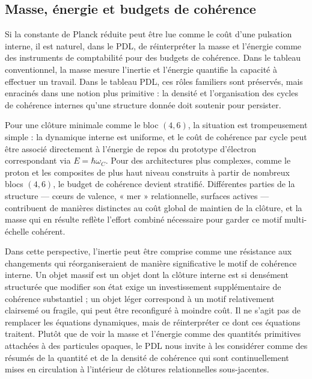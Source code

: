 \documentclass[11pt,a4paper]{article}
\theoremstyle{definition}
\begin{document}
\subsection{Masse, énergie et budgets de cohérence}

Si la constante de Planck réduite peut être lue comme le coût d’une pulsation interne, il est naturel, dans le PDL, de réinterpréter la masse et l’énergie comme des instruments de comptabilité pour des budgets de cohérence.\cite{Laubscher_EmergencePhysicalReality_2024,Laubscher_Existence_PulsatingClosure_2026} Dans le tableau conventionnel, la masse mesure l’inertie et l’énergie quantifie la capacité à effectuer un travail. Dans le tableau PDL, ces rôles familiers sont préservés, mais enracinés dans une notion plus primitive : la densité et l’organisation des cycles de cohérence internes qu’une structure donnée doit soutenir pour persister.

Pour une clôture minimale comme le bloc \((4,6)\), la situation est trompeusement simple : la dynamique interne est uniforme, et le coût de cohérence par cycle peut être associé directement à l’énergie de repos du prototype d’électron correspondant via \(E = \hbar \omega_C\).\cite{Laubscher_EmergencePhysicalReality_2024,Laubscher_Schrodinger_Compat_v2_2024} Pour des architectures plus complexes, comme le proton et les composites de plus haut niveau construits à partir de nombreux blocs \((4,6)\), le budget de cohérence devient stratifié. Différentes parties de la structure — cœurs de valence, « mer » relationnelle, surfaces actives — contribuent de manières distinctes au coût global de maintien de la clôture, et la masse qui en résulte reflète l’effort combiné nécessaire pour garder ce motif multi-échelle cohérent.\cite{Laubscher_ProtonArch_v2_2024,Laubscher_Alpha_v2_2024}

Dans cette perspective, l’inertie peut être comprise comme une résistance aux changements qui réorganiseraient de manière significative le motif de cohérence interne. Un objet massif est un objet dont la clôture interne est si densément structurée que modifier son état exige un investissement supplémentaire de cohérence substantiel ; un objet léger correspond à un motif relativement clairsemé ou fragile, qui peut être reconfiguré à moindre coût.\cite{Laubscher_Existence_PulsatingClosure_2026,Laubscher_PDL_Position_2024} Il ne s’agit pas de remplacer les équations dynamiques, mais de réinterpréter ce dont ces équations traitent. Plutôt que de voir la masse et l’énergie comme des quantités primitives attachées à des particules opaques, le PDL nous invite à les considérer comme des résumés de la quantité et de la densité de cohérence qui sont continuellement mises en circulation à l’intérieur de clôtures relationnelles sous-jacentes.
\end{document}
